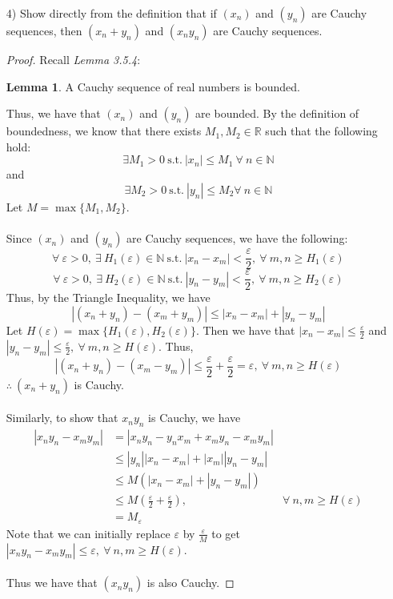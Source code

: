 \documentclass[12pt,letterpaper]{article}
\newcommand{\st}{\ \text{s.t.}\ }
\newcommand{\R}{\mathbb{R}}
\newcommand{\N}{\mathbb{N}}
\theoremstyle{case}
\theoremstyle{definition}
\newtheorem*{lemma*}{Lemma}
\begin{document}
\begin{enumerate}
\begin{enumerate}
			\item[4)] Show directly from the definition that if $(x_n)$ and $(y_n)$ are Cauchy sequences, then $(x_n+y_n)$ and $(x_ny_n)$ are Cauchy sequences.
			\begin{proof}
				Recall \textit{Lemma 3.5.4}:
				\begin{lemma*}
					A Cauchy sequence of real numbers is bounded.
				\end{lemma*}
				Thus, we have that $(x_n)$ and $(y_n)$ are bounded. By the definition of boundedness, we know that there exists $M_1,M_2 \in \R$ such that the following hold:
				\[\exists M_1>0 \st |x_n|\leq M_1\ \forall\ n \in \N\]
				and
				\[\exists M_2>0 \st |y_n| \leq M_2 \forall\ n \in \N\]
				Let $M=\max \{M_1, M_2\}$.
				\\\\Since $(x_n)$ and $(y_n)$ are Cauchy sequences, we have the following:
				\[\forall\ \varepsilon>0,\ \exists\ H_1(\varepsilon) \in \N \st |x_n-x_m|<\frac{\varepsilon}{2},\ \forall\ m,n\geq H_1(\varepsilon)\]
				\[\forall\ \varepsilon>0,\ \exists\ H_2(\varepsilon) \in \N \st |y_n-y_m|<\frac{\varepsilon}{2},\ \forall\ m,n\geq H_2(\varepsilon)\]
				Thus, by the Triangle Inequality, we have
				\[|(x_n+y_n)-(x_m+y_m)|\leq|x_n-x_m|+|y_n-y_m|\]
				Let $H(\varepsilon) = \max \{H_1(\varepsilon), H_2(\varepsilon)\}$. Then we have that $|x_n-x_m| \leq \frac{\varepsilon}{2}$ and $|y_n-y_m| \leq \frac{\varepsilon}{2},\ \forall\ m,n \geq H(\varepsilon)$. Thus,
				\[|(x_n+y_n)-(x_m-y_m)| \leq \frac{\varepsilon}{2}+\frac{\varepsilon}{2}=\varepsilon,\ \forall\ m,n \geq H(\varepsilon)\]
				$\therefore\ (x_n+y_n)$ is Cauchy.
				\\\\Similarly, to show that $x_ny_n$ is Cauchy, we have
				\begin{align*}
					|x_ny_n-x_my_m| &= |x_ny_n-y_nx_m+x_my_n-x_my_m| \\
					&\leq |y_n||x_n-x_m|+|x_m||y_n-y_m| \\
					&\leq M(|x_n-x_m|+|y_n-y_m|) \\
					&\leq M \left(\frac{\varepsilon}{2}+\frac{\varepsilon}{2}\right), &\forall\ n,m\geq H(\varepsilon) \\
					&= M_\varepsilon
				\end{align*} 
				Note that we can initially replace $\varepsilon$ by $\frac{\varepsilon}{M}$ to get $|x_ny_n-x_my_m|\leq \varepsilon,\ \forall\ n,m \geq H(\varepsilon)$.
				\\\\Thus we have that $(x_ny_n)$ is also Cauchy.
				

\end{proof}
\end{enumerate}
\end{enumerate}
\end{document}
